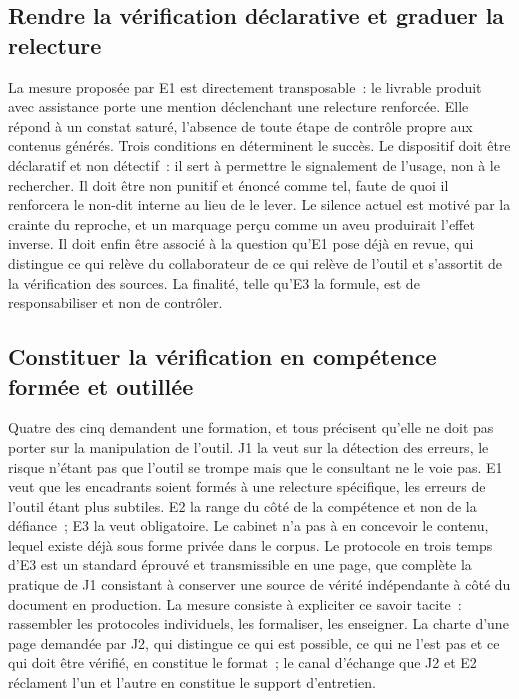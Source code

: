 \subsection{Rendre la vérification déclarative et graduer la relecture}

La mesure proposée par E1 est directement transposable~: le livrable produit avec assistance
porte une mention déclenchant une relecture renforcée. Elle répond à un constat saturé,
l'absence de toute étape de contrôle propre aux contenus générés. Trois conditions en
déterminent le succès. Le dispositif doit être déclaratif et non détectif~: il sert à
permettre le signalement de l'usage, non à le rechercher. Il doit être non punitif et énoncé
comme tel, faute de quoi il renforcera le non-dit interne au lieu de le lever. Le silence
actuel est motivé par la crainte du reproche, et un marquage perçu comme un aveu produirait
l'effet inverse. Il doit enfin être associé à la question qu'E1 pose déjà en revue, qui
distingue ce qui relève du collaborateur de ce qui relève de l'outil et s'assortit de la
vérification des sources. La finalité, telle qu'E3 la formule, est de responsabiliser et non
de contrôler.

\subsection{Constituer la vérification en compétence formée et outillée}

Quatre des cinq demandent une formation, et tous précisent qu'elle ne doit pas porter sur la
manipulation de l'outil. J1 la veut sur la détection des erreurs, le risque n'étant pas que
l'outil se trompe mais que le consultant ne le voie pas. E1 veut que les encadrants soient
formés à une relecture spécifique, les erreurs de l'outil étant plus subtiles. E2 la range du
côté de la compétence et non de la défiance~; E3 la veut obligatoire. Le cabinet n'a pas à en
concevoir le contenu, lequel existe déjà sous forme privée dans le corpus. Le protocole en
trois temps d'E3 est un standard éprouvé et transmissible en une page, que complète la
pratique de J1 consistant à conserver une source de vérité indépendante à côté du document en
production. La mesure consiste à expliciter ce savoir tacite~: rassembler les protocoles
individuels, les formaliser, les enseigner. La charte d'une page demandée par J2, qui
distingue ce qui est possible, ce qui ne l'est pas et ce qui doit être vérifié, en constitue
le format~; le canal d'échange que J2 et E2 réclament l'un et l'autre en constitue le
support d'entretien.

